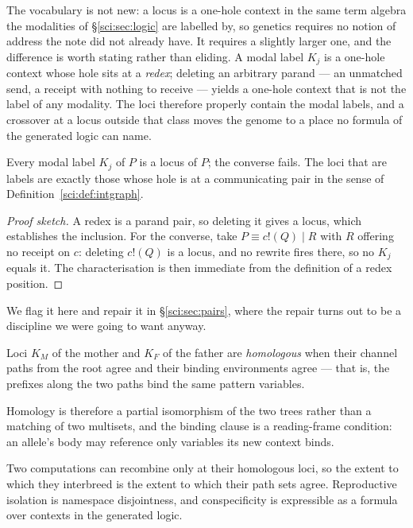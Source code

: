 The vocabulary is not new: a locus is a one-hole context in the same term algebra the modalities of
\S\ref{sci:sec:logic} are labelled by, so genetics requires no notion of address the note did not
already have. It requires a slightly larger one, and the difference is worth stating rather than
eliding. A modal label $K_j$ is a one-hole context whose hole sits at a \emph{redex}; deleting an
arbitrary parand --- an unmatched send, a receipt with nothing to receive --- yields a one-hole
context that is not the label of any modality. The loci therefore properly contain the modal
labels, and a crossover at a locus outside that class moves the genome to a place no formula of the
generated logic can name.

\begin{proposition}
\label{sci:prop:locivlabels}
Every modal label $K_j$ of $P$ is a locus of $P$; the converse fails. The loci that are labels are
exactly those whose hole is at a communicating pair in the sense of
Definition~\ref{sci:def:intgraph}.
\end{proposition}
\begin{proof}[Proof sketch]
A redex is a parand pair, so deleting it gives a locus, which establishes the inclusion. For the
converse, take $P \equiv c!(Q) \mid R$ with $R$ offering no receipt on $c$: deleting $c!(Q)$ is a
locus, and no rewrite fires there, so no $K_j$ equals it. The characterisation is then immediate
from the definition of a redex position.
\end{proof}

We flag it here and repair it in \S\ref{sci:sec:pairs}, where the repair turns out to be a discipline
we were going to want anyway.

\begin{definition}[Homology]
\label{sci:def:homology}
Loci $K_M$ of the mother and $K_F$ of the father are \emph{homologous} when their channel paths from
the root agree and their binding environments agree --- that is, the prefixes along the two paths bind
the same pattern variables.
\end{definition}

Homology is therefore a partial isomorphism of the two trees rather than a matching of two multisets,
and the binding clause is a reading-frame condition: an allele's body may reference only variables its
new context binds.

\begin{proposition}
\label{sci:prop:species}
Two computations can recombine only at their homologous loci, so the extent to which they interbreed
is the extent to which their path sets agree. Reproductive isolation is namespace disjointness, and
conspecificity is expressible as a formula over contexts in the generated logic.
\end{proposition}

